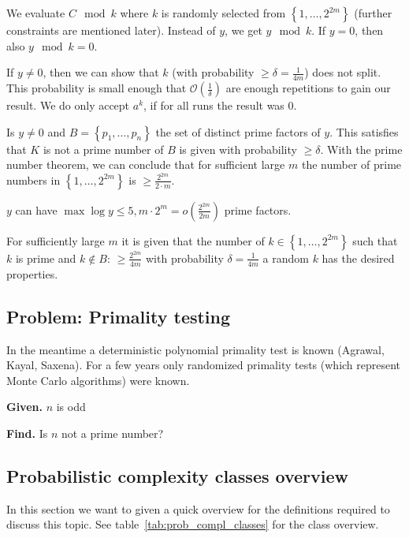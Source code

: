 \documentclass[a4paper]{article}
\newcommand{\given}[1]{\textbf{Given.} #1\par}
\newcommand{\find}[1]{\textbf{Find.} #1\par}
\newcommand{\set}[1]{\left\{#1\right\}}
\newenvironment{spec}[0]{\begin{framed}}{\end{framed}}
\begin{document}
We evaluate $C \mod{k}$ where $k$ is randomly selected from $\set{1, \ldots, 2^{2m}}$
(further constraints are mentioned later).
Instead of $y$, we get $y\mod{k}$. If $y = 0$, then also $y \mod{k} = 0$.

If $y \neq 0$, then we can show that $k$ (with probability $\geq \delta = \frac1{4m}$)
does not split. This probability is small enough that $\mathcal{O}(\frac1{\delta})$
are enough repetitions to gain our result.
We do only accept $a^k$, if for all runs the result was $0$.

Is $y \neq 0$ and $B = \set{p_1, \ldots, p_n}$ the set of distinct prime factors
of $y$. This satisfies that $K$ is not a prime number of $B$ is given with probability $\geq \delta$.
With the prime number theorem, we can conclude that for sufficient large $m$
the number of prime numbers in $\set{1, \ldots, 2^{2m}}$ is $\geq \frac{2^{2m}}{2\cdot m}$.

$y$ can have $\max \log{y} \leq 5, m\cdot 2^m = o(\frac{2^{2m}}{2m})$ prime factors.

For sufficiently large $m$ it is given that the number of $k \in \set{1,\ldots,2^{2m}}$
such that $k$ is prime and $k \notin B$: $\geq \frac{2^{2m}}{4m}$
with probability $\delta = \frac{1}{4m}$ a random $k$ has the desired properties.

\subsection{Problem: Primality testing}
\label{sec:primality-test-algorithm}
%
In the meantime a deterministic polynomial primality test is known
(Agrawal, Kayal, Saxena). For a few years only randomized primality tests
(which represent Monte Carlo algorithms) were known.

\begin{spec}
  \given{$n$ is odd}
  \find{Is $n$ not a prime number?}
\end{spec}

\subsection{Probabilistic complexity classes overview}
%
In this section we want to given a quick overview for the definitions required to discuss this topic.
See table~\ref{tab:prob_compl_classes} for the class overview.
\end{document}
